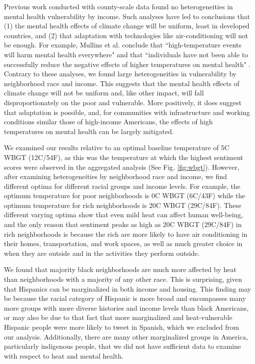 \documentclass[fleqn,10pt]{wlscirep}
\begin{document}
Previous work conducted with county-scale data found no heterogeneities in mental health vulnerability by income.  Such analyses have led to conclusions that (1) the mental health effects of climate change will be uniform, least in developed countries, and (2) that adaptation with technologies like air-conditioning will not be enough.  For example, Mullins et al. conclude that ``high-temperature events will harm mental health everywhere" and that ``individuals have not been able to successfully reduce the negative effects of higher temperatures on mental health" \cite{Mullins2019Dec}.  Contrary to these analyses, we found large heterogeneities in vulnerability by neighborhood race and income.  This suggests that the mental health effects of climate change will not be uniform and, like other impact, will fall disproportionately on the poor and vulnerable.  More positively, it does suggest that adaptation is possible, and, for communities with infrastructure and working conditions similar those of high-income Americans, the effects of high temperatures on mental health can be largely mitigated.

We examined our results relative to an optimal baseline temperature of 5\textdegree C WBGT (12\textdegree C/54\textdegree F), as this was the temperature at which the highest sentiment scores were observed in the aggregated analysis (See Fig. \ref{fig:wbgt}).  However, after examining heterogeneities by neighborhood race and income, we find different optima for different racial groups and income levels.  For example, the optimum temperature for poor neighborhoods is 0\textdegree C WBGT (6\textdegree C/43\textdegree F) while the optimum temperature for rich neighborhoods is 20\textdegree C WBGT (29\textdegree C/84\textdegree F).  These different varying optima show that even mild heat can affect human well-being, and the only reason that sentiment peaks as high as 20\textdegree C WBGT (29\textdegree C/84\textdegree F) in rich neighborhoods is because the rich are more likely to have air conditioning in their homes, transportation, and work spaces, as well as much greater choice in when they are outside and in the activities they perform outside.

We found that majority black neighborhoods are much more affected by heat than neighborhoods with a majority of any other race.  This is surprising, given that Hispanics can be marginalized in both income and housing.  This finding may be because the racial category of Hispanic is more broad and encompasses many more groups with more diverse histories and income levels than black Americans, or may also be due to that fact that more marginalized and heat-vulnerable Hispanic people were more likely to tweet in Spanish, which we excluded from our analysis.  Additionally, there are many other marginalized groups in America, particularly indigenous people, that we did not have sufficient data to examine with respect to heat and mental health.  
\end{document}
